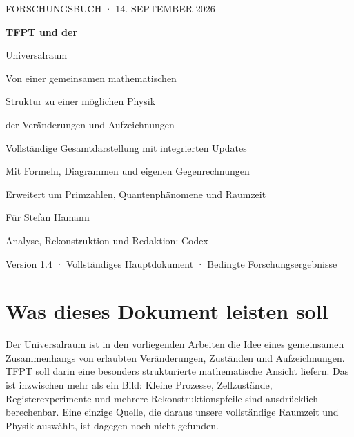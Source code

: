 \documentclass[11pt,a4paper,oneside,parskip=half,headings=normal]{scrreprt}
\begin{document}
\hypersetup{pageanchor=false}
\begin{titlepage}
\pagecolor{navy}\color{white}
\vspace*{5mm}
{\sffamily\large FORSCHUNGSBUCH · 14. SEPTEMBER 2026\par}
\vspace{22mm}
{\sffamily\bfseries\fontsize{36}{42}\selectfont TFPT und der\par Universalraum\par}
\vspace{12mm}
{\sffamily\fontsize{17}{23}\selectfont Von einer gemeinsamen mathematischen\par Struktur zu einer möglichen Physik\par der Veränderungen und Aufzeichnungen\par}
\vspace{15mm}
\vfill
{\sffamily\large Vollständige Gesamtdarstellung mit integrierten Updates\par}
\vspace{4mm}
{\sffamily\normalsize Mit Formeln, Diagrammen und eigenen Gegenrechnungen\par Erweitert um Primzahlen, Quantenphänomene und Raumzeit\par}
\vspace{12mm}
{\sffamily\small Für Stefan Hamann\par Analyse, Rekonstruktion und Redaktion: Codex\par}
\vspace{6mm}
{\sffamily\small\color{white!75}Version 1.4 · Vollständiges Hauptdokument · Bedingte Forschungsergebnisse\par}
\end{titlepage}
\nopagecolor\color{black}
\hypersetup{pageanchor=true}
\chapter*{Was dieses Dokument leisten soll}
Der Universalraum ist in den vorliegenden Arbeiten die Idee eines gemeinsamen Zusammenhangs von erlaubten Veränderungen, Zuständen und Aufzeichnungen. TFPT soll darin eine besonders strukturierte mathematische Ansicht liefern. Das ist inzwischen mehr als ein Bild: Kleine Prozesse, Zellzustände, Registerexperimente und mehrere Rekonstruktionspfeile sind ausdrücklich berechenbar. Eine einzige Quelle, die daraus unsere vollständige Raumzeit und Physik auswählt, ist dagegen noch nicht gefunden.
\end{document}
